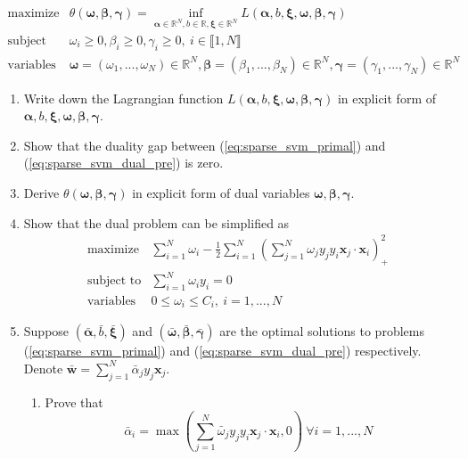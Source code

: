 \documentclass{article}
\newcommand{\real}{\mathbb{R}}
\def\vecw{{\mathbf w}}
\def\vecx{{\mathbf x}}
\def\vecalpha{{\mathbf \alpha}}
\def\vecbeta{{\mathbf \beta}}
\def\vecgamma{{\boldsymbol \gamma}}
\def\vecomega{{\boldsymbol \omega}}
\def\vecxi{{\boldsymbol \xi}}
\def\real{{\mathbb {R}}}
\begin{document}
\begin{equation}\label{eq:sparse_svm_dual_pre}
\begin{array}{ll}
\mbox{maximize} 	& \theta(\vecomega,\vecbeta,\vecgamma) = \inf_{\vecalpha \in \real^N, b \in \real, \vecxi \in \real^N}L(\vecalpha,b,\vecxi,\vecomega,\vecbeta,\vecgamma)\\
\mbox{subject to} 	& \omega_i \geq 0, \beta_i \geq 0, \gamma_i \geq 0, ~ i \in \llbracket 1,N \rrbracket\\
\mbox{variables} 	& \vecomega = (\omega_1,...,\omega_N) \in \real^N, \vecbeta = (\beta_1,...,\beta_N) \in \real^N, \vecgamma = (\gamma_1,...,\gamma_N) \in \real^N
\end{array}
\end{equation}
%
\begin{enumerate}
\item Write down the Lagrangian function $L(\vecalpha,b,\vecxi,\vecomega,\vecbeta,\vecgamma)$ in explicit form of $\vecalpha,b,\vecxi,\vecomega,\vecbeta,\vecgamma$.
\item  Show that the duality gap between (\ref{eq:sparse_svm_primal}) and (\ref{eq:sparse_svm_dual_pre}) is zero.
\item Derive $\theta(\vecomega,\vecbeta,\vecgamma)$ in explicit form of dual variables $\vecomega,\vecbeta,\vecgamma$.
\item  Show that the dual problem can be simplified as
\begin{equation}\label{eq:sparse_svm_dual}
\begin{array}{ll}
\mbox{maximize} 	& \sum_{i=1}^N \omega_i - \frac{1}{2}\sum_{i=1}^N \left( \sum_{j=1}^N \omega_j y_j y_i \vecx_j \cdot \vecx_i \right)_+^2\\
\mbox{subject to} 	& \sum_{i=1}^N \omega_i y_i = 0\\
\mbox{variables} 	& 0 \leq \omega_i \leq C_i, ~ i=1,...,N
\end{array}
\end{equation}
%
\item Suppose $({\bar \vecalpha}, {\bar b}, {\bar \vecxi})$ and $({\bar \vecomega},{\bar \vecbeta}, {\bar \vecgamma})$ are the optimal solutions to problems (\ref{eq:sparse_svm_primal}) and (\ref{eq:sparse_svm_dual_pre}) respectively.  Denote ${\bar \vecw} = \sum_{j=1}^N {\bar \alpha}_j y_j \vecx_j$.
\begin{enumerate}
\item Prove that
\begin{equation}\label{eq:sparse_svm_optimal_alpha}
{\bar \alpha}_i = \max\left(\sum_{j=1}^N {\bar \omega}_j y_j y_i \vecx_j \cdot \vecx_i, 0\right) ~ \forall i=1,...,N

\end{equation}
\end{enumerate}
\end{enumerate}
\end{document}
